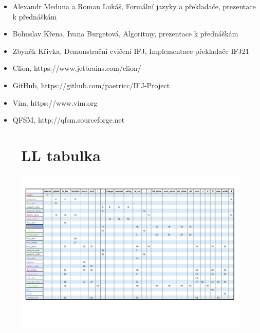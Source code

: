 \documentclass[12pt, letterpaper]{article}
\begin{document}
\begin{itemize}
\normalsize
  \item Alexandr Meduna a Roman Lukáš, Formální jazyky a překladače, prezentace k přednáškám
  \item Bohuslav Křena, Ivana Burgetová, Algoritmy, prezentace k přednáškám
  \item Zbyněk Křivka, Demonstrační cvičení IFJ, Implementace překladače IFJ21 
  \item Clion, https://www.jetbrains.com/clion/
  \item GitHub, https://github.com/paetricc/IFJ-Project
  \item Vim, https://www.vim.org
  \item QFSM, http://qfsm.sourceforge.net
\end{itemize}

	\begin{figure}
        \section{LL tabulka}
	        \includegraphics[width=\textwidth,height=\textheight,keepaspectratio]{LLTabulka.pdf}
    \end{figure}
\end{document}

